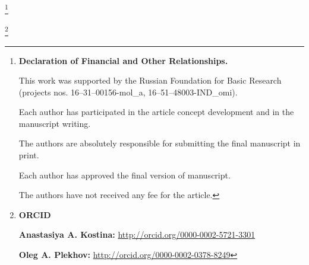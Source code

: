 \makeentitle



\newpage





\thanks{{\bf Declaration of Financial and Other Relationships.}

This work was supported by the Russian Foundation for Basic Research (projects nos. 16--31--00156-mol\_a, 16--51--48003-IND\_omi).

Each author has participated in the article concept development and in the manuscript writing.

The authors are absolutely responsible for submitting the final manuscript in print.

Each author has approved the final version of manuscript.

The authors have not received any fee for the article.

}







\thanks{{\bf ORCID}



{\bf Anastasiya A. Kostina:}  \url{http://orcid.org/0000-0002-5721-3301}



{\bf Oleg A. Plekhov:}  \url{http://orcid.org/0000-0002-0378-8249}



}







\EngRef



